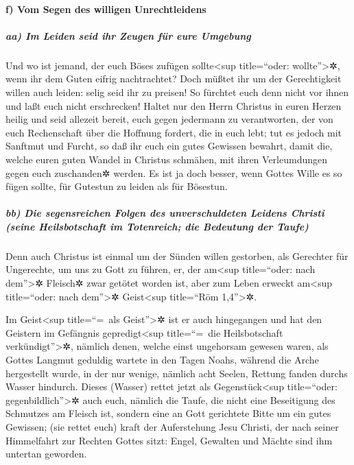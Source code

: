 \hypertarget{f-vom-segen-des-willigen-unrechtleidens}{%
\paragraph{f) Vom Segen des willigen
Unrechtleidens}\label{f-vom-segen-des-willigen-unrechtleidens}}

\hypertarget{aa-im-leiden-seid-ihr-zeugen-fuxfcr-eure-umgebung}{%
\subparagraph{aa) Im Leiden seid ihr Zeugen für eure
Umgebung}\label{aa-im-leiden-seid-ihr-zeugen-fuxfcr-eure-umgebung}}

 Und wo ist jemand, der euch Böses zufügen
sollte\textless sup title=``oder: wollte''\textgreater✲, wenn ihr dem
Guten eifrig nachtrachtet?  Doch müßtet ihr um der
Gerechtigkeit willen auch leiden: selig seid ihr zu preisen! So fürchtet
euch denn nicht vor ihnen und laßt euch nicht erschrecken!
 Haltet nur den Herrn Christus in euren Herzen heilig und
seid allezeit bereit, euch gegen jedermann zu verantworten, der von euch
Rechenschaft über die Hoffnung fordert, die in euch lebt;
 tut es jedoch mit Sanftmut und Furcht, so daß ihr euch
ein gutes Gewissen bewahrt, damit die, welche euren guten Wandel in
Christus schmähen, mit ihren Verleumdungen gegen euch zuschanden✲
werden.  Es ist ja doch besser, wenn Gottes Wille es so
fügen sollte, für Gutestun zu leiden als für Bösestun.

\hypertarget{bb-die-segensreichen-folgen-des-unverschuldeten-leidens-christi-seine-heilsbotschaft-im-totenreich-die-bedeutung-der-taufe}{%
\subparagraph{bb) Die segensreichen Folgen des unverschuldeten Leidens
Christi (seine Heilsbotschaft im Totenreich; die Bedeutung der
Taufe)}\label{bb-die-segensreichen-folgen-des-unverschuldeten-leidens-christi-seine-heilsbotschaft-im-totenreich-die-bedeutung-der-taufe}}

 Denn auch Christus ist einmal um der Sünden willen
gestorben, als Gerechter für Ungerechte, um uns zu Gott zu führen, er,
der am\textless sup title=``oder: nach dem''\textgreater✲ Fleisch✲ zwar
getötet worden ist, aber zum Leben erweckt am\textless sup title=``oder:
nach dem''\textgreater✲ Geist\textless sup title=``Röm
1,4''\textgreater✲.

 Im Geist\textless sup title=``=~als Geist''\textgreater✲
ist er auch hingegangen und hat den Geistern im Gefängnis
gepredigt\textless sup title=``=~die Heilsbotschaft
verkündigt''\textgreater✲,  nämlich denen, welche einst
ungehorsam gewesen waren, als Gottes Langmut geduldig wartete in den
Tagen Noahs, während die Arche hergestellt wurde, in der nur wenige,
nämlich acht Seelen, Rettung fanden durchs Wasser hindurch.
 Dieses (Wasser) rettet jetzt als Gegenstück\textless sup
title=``oder: gegenbildlich''\textgreater✲ auch euch, nämlich die Taufe,
die nicht eine Beseitigung des Schmutzes am Fleisch ist, sondern eine an
Gott gerichtete Bitte um ein gutes Gewissen; (sie rettet euch) kraft der
Auferstehung Jesu Christi,  der nach seiner Himmelfahrt
zur Rechten Gottes sitzt: Engel, Gewalten und Mächte sind ihm untertan
geworden.

